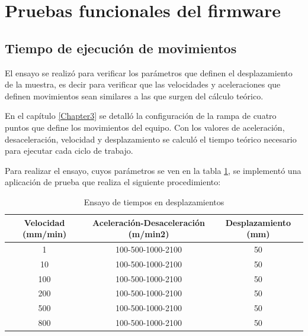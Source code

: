 \section{Pruebas funcionales del firmware}
\subsection{Tiempo de ejecución de movimientos}

El ensayo se realizó para verificar los parámetros que definen el desplazamiento de la muestra, es decir para verificar que las velocidades y aceleraciones que definen movimientos sean similares a las que surgen del cálculo teórico.

En el capítulo \ref{Chapter3} se detalló la configuración de la rampa de cuatro puntos que define los movimientos del equipo. Con los valores de aceleración, desaceleración, velocidad y desplazamiento se calculó el tiempo teórico necesario para ejecutar cada ciclo de trabajo.



Para realizar el ensayo, cuyos parámetros se ven en la tabla \ref{tab:ensayo_comandos}, se implementó una aplicación de prueba que realiza el siguiente procedimiento: 

\begin{table}[h!]
	\centering
	\caption[Ensayo de tiempos en desplazamientos]{Ensayo de tiempos en desplazamientos}
	\begin{tabular}{c c c }    
		\toprule
		\textbf{Velocidad (mm/min)}     & \textbf{Aceleración-Desaceleración (m/min2)} & \textbf{Desplazamiento (mm)} \\
		\midrule
		1  	 & 	   100-500-1000-2100      & 	50  			 	\\		
		10     & 	   100-500-1000-2100  	& 	50 			\\
		100    & 	   100-500-1000-2100 	    & 	50  				\\
		200  	 & 	   100-500-1000-2100 	    & 	50  			\\
		500  	 & 	   100-500-1000-2100      & 	50 					\\
		800  	 & 	   100-500-1000-2100      & 	50 					\\
		\bottomrule
		\hline
	\end{tabular}
	\label{tab:ensayo_comandos}
\end{table}



